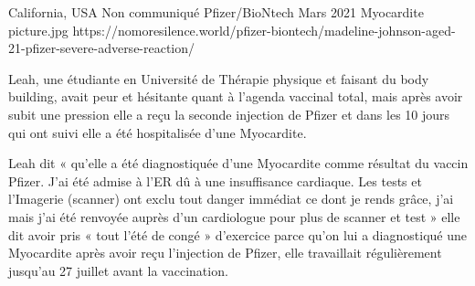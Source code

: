 {California, USA}
{Non communiqué}
{Pfizer/BioNtech}
{Mars 2021}
{Myocardite}
{picture.jpg}
{https://nomoresilence.world/pfizer-biontech/madeline-johnson-aged-21-pfizer-severe-adverse-reaction/}
{

Leah, une étudiante en Université de Thérapie physique et faisant du body
building, avait peur et hésitante quant à l’agenda vaccinal total, mais après
avoir subit une pression elle a reçu la seconde injection de Pfizer et dans les
10 jours qui ont suivi elle a été hospitalisée d’une Myocardite.

Leah dit « qu’elle a été diagnostiquée d’une Myocardite comme résultat du vaccin
Pfizer. J’ai été admise à l’ER dû à une insuffisance cardiaque. Les tests et
l’Imagerie (scanner) ont exclu tout danger immédiat ce dont je rends grâce, j’ai
mais j’ai été renvoyée auprès d’un cardiologue pour plus de scanner et test »
elle dit avoir pris « tout l’été de congé » d’exercice parce qu’on lui a
diagnostiqué une Myocardite après avoir reçu l’injection de Pfizer, elle
travaillait régulièrement jusqu’au 27 juillet avant la vaccination.

}

